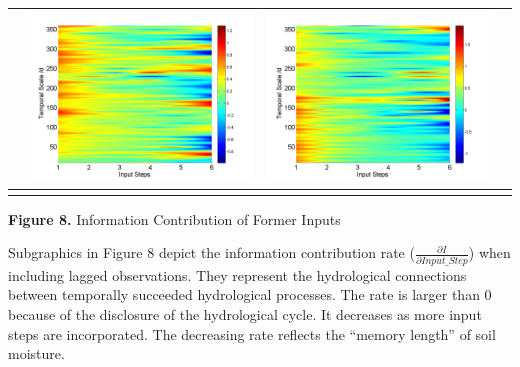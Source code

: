 \documentclass[review]{elsarticle}
\begin{document}
\begin{table}[H]
\begin{tabular}{cccc}
&\begin{minipage}{.3\textwidth}\includegraphics[width=\linewidth]{resultgraph/06810000epdiff_former.png}\end{minipage}
&\begin{minipage}{.3\textwidth}\includegraphics[width=\linewidth]{resultgraph/06810000qdiff_former.png}\end{minipage}
\\
\hline
\\
\end{tabular}
\Large{\textbf{Figure 8.} Information Contribution of Former Inputs }
\end{table}
Subgraphics in Figure 8 depict the information contribution rate ($\frac{\partial I}{\partial Input\_Step}$) when including lagged observations. They represent the hydrological connections between temporally succeeded hydrological processes. The rate is larger than 0 because of the disclosure of the hydrological cycle. It decreases as more input steps are incorporated. The decreasing rate reflects the ``memory length'' of soil moisture.  
\end{document}
